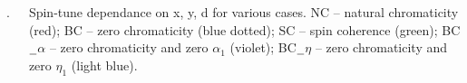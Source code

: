 \documentclass[25pt, a0paper, portrait, blockverticalspace=.5cm]{tikzposter}
\begin{document}
\begin{columns}
{\begin{minipage}{0.235\linewidth}
\begin{tikzpicture}
			\end{tikzpicture}
		\end{minipage}
		\begin{minipage}{0.235\linewidth}
		\end{minipage}
		\begin{minipage}{0.04\linewidth}
		\par  $.$
		\end{minipage}
		\begin{minipage}{0.235\linewidth}
		\par Spin-tune dependance on x, y, d for various cases. NC – natural chromaticity (red); BC – zero chromaticity (blue dotted); SC – spin coherence (green); BC$\underline {\hspace{0.2cm}}$$\alpha$ –  zero chromaticity and zero $\alpha_{1}$ (violet); BC$\underline {\hspace{0.2cm}}$$\eta$ –  zero chromaticity and zero $\eta_{1}$ (light blue).
		\end{minipage}
		\newline
		\newline
		
		\begin{minipage}{0.3\linewidth}

\end{minipage}}
\end{columns}
\end{document}
